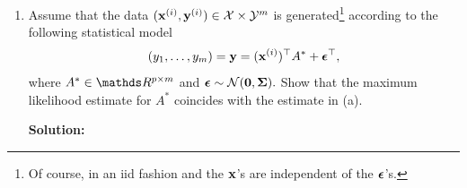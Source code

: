 \documentclass[a4paper]{article}
\begin{document}
{\begin{enumerate}
%	
	In particular, the gradient of $f$ w.r.t.\ matrix $A=(\ba_1 ~ \ldots ~ \ba_m)$ is 
%	
	\begin{align*}
%		
		\nabla f(A) 
%		
		&= ( \nabla f_1(\ba_1) ~ \ldots ~ \nabla f_m(\ba_m) )  \\
%		
		&= \left( - 2 \bm{y}_1^\top \Xmat  + 2 \Xmat^\top  \Xmat \bm{a}_1 \quad \ldots \quad - 2 \bm{y}_m^\top \Xmat  + 2 \Xmat^\top  \Xmat \bm{a}_m\right) \\
%		
		&= -2Y^\top \Xmat  + 2 \Xmat^\top  \Xmat A.
%		
	\end{align*}
%
	Hence, a gradient descent routine with (fixed) step size $\alpha$ for $f$ would iterate as follows:
%	
	\begin{align*}
%		
		\hat A \leftarrow \hat A - 2 \alpha \left( -Y^\top \Xmat  +  \Xmat^\top  \Xmat \hat A \right).
%		
	\end{align*}
%
	\item Assume that the data $(\mathbf{x}^{(i)},\mathbf{y}^{(i)}) \in \mathcal{X} \times \mathcal{Y}^m$ is generated\footnote{Of course, in an iid fashion and the $\mathbf{x}$'s are independent of the $\bm{\epsilon}$'s.} according to the following statistical model
%	
	$$	(y_1,\ldots,y_m) =	\mathbf{y} = (\mathbf{x}^{(i)})^\top A^* + \bm{\epsilon}^\top,		$$
%	
	where $A^* \in \R^{p\times m}$ and $\bm{\epsilon} \sim \mathcal{N}(\bm{0},\bm{\Sigma}).$
%
	Show that the maximum likelihood estimate for $A^*$ coincides with the estimate in (a). 
	
	\textbf{Solution:}
%	
	

\end{enumerate}}
\end{document}
